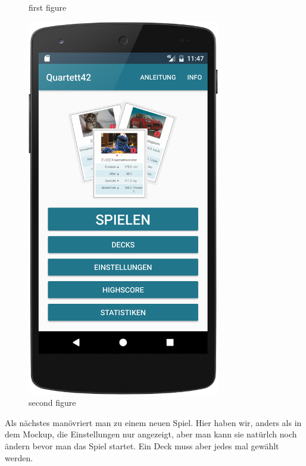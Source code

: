 \begin{figure}[h]
\begin{minipage}{0.45\textwidth}
        \caption{first figure}
    \end{minipage}
    \begin{minipage}{0.45\textwidth}
        \centering
        \includegraphics[width=0.75\textwidth]{img/screenshots/device_main_screen.png}
        \caption{second figure}
    \end{minipage}
\end{figure}

Als nächstes manövriert man zu einem neuen Spiel. Hier haben wir, anders als in dem Mockup, die Einstellungen nur angezeigt, aber man kann sie natürlch noch ändern bevor man das Spiel startet. Ein Deck muss aber jedes mal gewählt werden. \\

